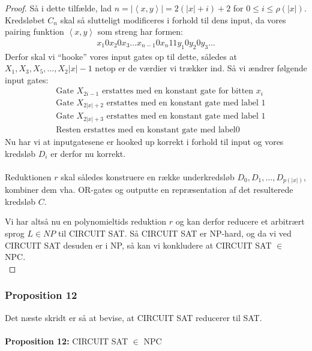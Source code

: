 \begin{proof}
Så i dette tilfælde, lad $n = |\left\langle x,y \right\rangle| = 2(|x| +
i) + 2$ for $0 \leq i \leq \rho(|x|)$. Kredsløbet $C_n$ skal så slutteligt
modificeres i forhold til dens input, da vores pairing funktion $\left\langle
x,y \right\rangle$ som streng har formen: \begin{align*} x_1 0 x_2 0 x_3 \hdots
x_{n-1} 0 x_n 11 y_1 0 y_2 0 y_3 \hdots \end{align*} Derfor skal vi ``hooke''
vores input gates op til dette, således at $X_1, X_3, X_5, \hdots, X_2|x|-1$
netop er de værdier vi trækker ind. Så vi ændrer følgende input gates:
\begin{align*} &\text{ Gate } X_{2i-1} \text{ erstattes med en konstant gate
for bitten } x_i \\ &\text{ Gate } X_{2|x|+2} \text{ erstattes med en konstant
gate med label } 1 \\ &\text{ Gate } X_{2|x|+3} \text{ erstattes med en konstant
gate med label } 1 \\ &\text{ Resten erstattes med en konstant gate med label
} 0 \end{align*} Nu har vi at inputgatesene er hooked up korrekt i forhold til
input og vores kredsløb $D_i$ er derfor nu korrekt.\\ ~\\ Reduktionen $r$ skal
således konstruere en række underkredsløb $D_0, D_1, \hdots, D_{p(|x|)}$,
kombiner dem vha. OR-gates og outputte en repræsentation af det resulterede
kredsløb $C$.

Vi har altså nu en polynomieltids reduktion $r$ og kan derfor reducere et
arbitrært sprog $L \in NP$ til CIRCUIT SAT. Så CIRCUIT SAT er NP-hard, og da
vi ved CIRCUIT SAT desuden er i NP, så kan vi konkludere at CIRCUIT SAT $\in$
NPC.\\ \end{proof}

\subsubsection{Proposition 12}

Det næste skridt er så at bevise, at CIRCUIT SAT reducerer til SAT.\\ ~\\
\textbf{Proposition 12:} CIRCUIT SAT $\in$ NPC

